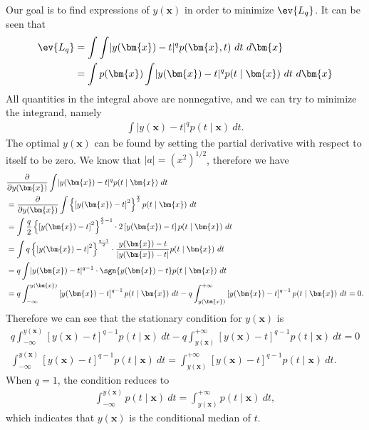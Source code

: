 \begin{answer}{}
	Our goal is to find expressions of $y(\bm{x})$ in order to minimize $\ev{L_q}$. It can be seen that
	\begin{align}
		\ev{L_q} &= \int\int \lvert y(\bm{x}) - t \rvert^q p(\bm{x}, t)\ dt\ d\bm{x}\\
		&= \int p(\bm{x}) \int \lvert y(\bm{x}) - t \rvert^q p(t \mid \bm{x}) \ dt\ d\bm{x}
	\end{align}
	All quantities in the integral above are nonnegative, and we can try to minimize the integrand, namely
	\begin{align}
		\int \lvert y(\bm{x}) - t \rvert^q p(t \mid \bm{x})\ dt.
	\end{align}
	The optimal $y(\bm{x})$ can be found by setting the partial derivative with respect to itself to be zero. We know that $\lvert a \rvert = \left(x^2 \right)^{1/2}$, therefore we have
	\begin{align}
		&\frac{\partial}{\partial y(\bm{x})}\int \lvert y(\bm{x}) - t \rvert^q p(t \mid \bm{x})\ dt\\
		&= \frac{\partial}{\partial y(\bm{x})}\int \left\{\left[ y(\bm{x}) - t \right]^2\right\}^{\frac{q}{2}} p(t \mid \bm{x})\ dt\\
		&= \int  \frac{q}{2} \left\{\left[ y(\bm{x}) - t \right]^2\right\}^{\frac{q}{2} - 1}\cdot 2\left[ y(\bm{x}) - t \right]p(t \mid \bm{x})\ dt\\
		&= \int q \left\{\left[ y(\bm{x}) - t \right]^2\right\}^{\frac{q-1}{2}} \cdot \frac{ y(\bm{x}) - t }{\left\lvert y(\bm{x}) - t\right\rvert}p(t \mid \bm{x})\ dt\\
		&= q \int \lvert y(\bm{x}) - t \rvert^{q-1} \cdot \sgn{y(\bm{x}) - t }p(t \mid \bm{x})\ dt\\
		&= q \int_{-\infty}^{y(\bm{x})} \left[ y(\bm{x}) - t \right]^{q-1} p(t \mid \bm{x})\ dt - q \int_{y(\bm{x})}^{+\infty} \left[ y(\bm{x}) - t \right]^{q-1}p(t \mid \bm{x})\ dt = 0.
	\end{align}
	Therefore we can see that the stationary condition for $y(\bm{x})$ is
	\begin{gather}
		q \int_{-\infty}^{y(\bm{x})} \left[ y(\bm{x}) - t \right]^{q-1} p(t \mid \bm{x})\ dt - q \int_{y(\bm{x})}^{+\infty} \left[ y(\bm{x}) - t \right]^{q-1}p(t \mid \bm{x})\ dt = 0\\
		 \int_{-\infty}^{y(\bm{x})} \left[ y(\bm{x}) - t \right]^{q-1} p(t \mid \bm{x})\ dt =  \int_{y(\bm{x})}^{+\infty} \left[ y(\bm{x}) - t \right]^{q-1}p(t \mid \bm{x})\ dt.
	\end{gather}
	When $q = 1$, the condition reduces to
	\begin{align}
		\int_{-\infty}^{y(\bm{x})} p(t \mid \bm{x})\ dt =  \int_{y(\bm{x})}^{+\infty}p(t \mid \bm{x})\ dt,
	\end{align}
	which indicates that $y(\bm{x})$ is the conditional median of $t$.
	

\end{answer}
